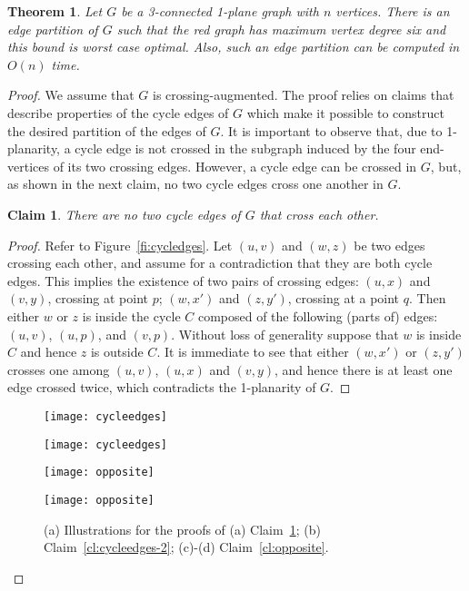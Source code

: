 \documentclass{article}
\newtheorem{claim}{Claim}
\newtheorem{theorem}{Theorem}
\begin{document}
\begin{theorem}\label{th:edge-decomposition}
Let $G$ be a 3-connected 1-plane graph with $n$ vertices.
There is an edge partition of $G$ such that the red graph has maximum vertex degree six and this bound is worst case optimal. Also, such an edge partition can be computed in $O(n)$ time.
\end{theorem}
\begin{proof}
We assume that $G$ is crossing-augmented. The proof relies on claims that describe properties of the cycle edges of $G$ which  make it possible to construct the desired partition of the edges of $G$. It is important to observe that, due to 1-planarity, a cycle edge  is not crossed in the subgraph induced by the four end-vertices of its two crossing edges. However, a cycle edge can be crossed in $G$, but, as shown in the next claim, no two cycle edges cross one another in $G$.

\begin{claim}\label{cl:cycleedges}
There are no two cycle edges of $G$ that cross each other.
\end{claim}
\begin{proof}
Refer to Figure~\ref{fi:cycledges}. Let $(u,v)$ and $(w,z)$ be two edges crossing each other, and assume for a contradiction that they are both cycle edges. This implies the existence of two pairs of crossing edges: $(u,x)$ and $(v,y)$, crossing at point $p$; $(w,x')$ and $(z,y')$, crossing at a point $q$. Then either $w$ or $z$ is inside the cycle $C$ composed of the following (parts of) edges: $(u,v)$, $(u,p)$, and $(v,p)$. Without loss of generality suppose that $w$ is inside $C$ and hence $z$ is outside $C$. It is immediate to see that either $(w,x')$ or $(z,y')$ crosses one among $(u,v)$, $(u,x)$ and $(v,y)$, and hence there is at least one edge crossed twice, which contradicts the 1-planarity of $G$.
\end{proof}

\begin{figure}[tb]
    \centering
    \begin{minipage}[b]{.24\textwidth}
    	\centering
    	\texttt{[image: cycleedges]}
    	\subcaption{}\label{fi:cycledges}
    \end{minipage}
    \begin{minipage}[b]{.24\textwidth}
    	\centering
    	\texttt{[image: cycleedges]}
    	\subcaption{}\label{fi:cycledges-2}
    \end{minipage}
    \begin{minipage}[b]{.24\textwidth}
    	\centering
    	\texttt{[image: opposite]}
    	\subcaption{}\label{fi:opposite-a}
    \end{minipage}
    \begin{minipage}[b]{.24\textwidth}
    	\centering
    	\texttt{[image: opposite]}
    	\subcaption{}\label{fi:opposite-b}
    	\end{minipage}
    \caption{(a) Illustrations for the proofs of (a) Claim~\ref{cl:cycleedges}; (b) Claim~\ref{cl:cycleedges-2}; (c)-(d) Claim~\ref{cl:opposite}.}
\end{figure}


\end{proof}
\end{document}
